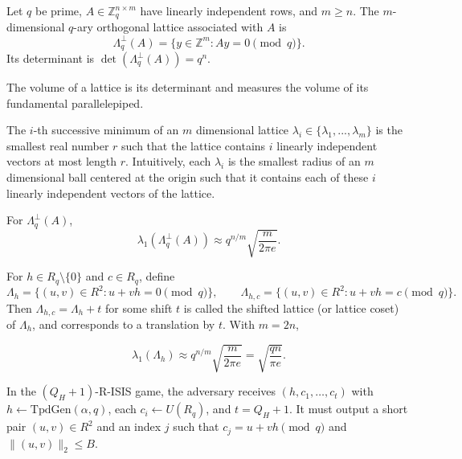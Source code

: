\begin{definition}
Let $q$ be prime, $A \in \mathbb{Z}_q^{n \times m}$ have linearly independent rows, and $m \ge n$.
The $m$-dimensional $q$-ary orthogonal lattice associated with $A$ is
\[
\Lambda_q^\perp(A) = \{y \in \mathbb{Z}^m : Ay = 0 \pmod q\}.
\]
Its determinant is $\det(\Lambda_q^\perp(A)) = q^n$.
\end{definition}

\begin{definition}
The volume of a lattice is its determinant and measures the volume of its fundamental parallelepiped.
\end{definition}

\begin{definition}
The $i$-th successive minimum of an $m$ dimensional lattice $\lambda_i \in \{\lambda_1, ..., \lambda_m\}$ is the smallest real number $r$ such that 
the lattice contains $i$ linearly independent vectors at most length $r$. Intuitively, each $\lambda_i$ is the smallest radius of an $m$ dimensional 
ball centered at the origin such that it contains each of these $i$ linearly independent vectors of the lattice.
\end{definition}

\begin{definition}
For $\Lambda_q^\perp(A)$,
\[
\lambda_1(\Lambda_q^\perp(A)) \approx q^{n/m}\sqrt{\frac{m}{2\pi e}}.
\]
\end{definition}

\begin{definition}
For $h \in R_q \setminus \{0\}$ and $c \in R_q$, define
\[
\Lambda_h = \{(u,v) \in R^2 : u + vh = 0 \pmod q\},
\qquad
\Lambda_{h,c} = \{(u,v) \in R^2 : u + vh = c \pmod q\}.
\]
Then $\Lambda_{h,c} = \Lambda_h + t$ for some shift $t$ is called the shifted lattice (or lattice coset) of $\Lambda_h$, and corresponds to a translation by $t$.
With $m = 2n$,

\[
\lambda_1(\Lambda_h) \approx q^{n/m}\sqrt{\frac{m}{2\pi e}}
= \sqrt{\frac{qn}{\pi e}}.
\]
\end{definition}

\begin{definition}
In the $(Q_H+1)$-R-ISIS game, the adversary receives $(h, c_1, \ldots, c_t)$ with $h \leftarrow \mathrm{TpdGen}(\alpha,q)$, each $c_i \leftarrow U(R_q)$, and $t = Q_H + 1$.
It must output a short pair $(u,v) \in R^2$ and an index $j$ such that $c_j = u + vh \pmod q$ and $\|(u,v)\|_2 \le B$.
\end{definition}

